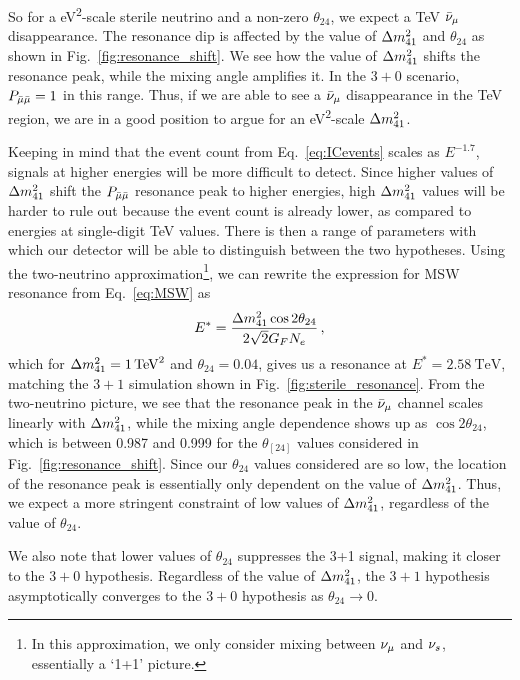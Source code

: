 So for a \si{\eV^2}-scale sterile neutrino and a non-zero $\theta_{24}$, we expect a \si{\TeV} $\bar{\nu}_\mu$ disappearance.
The resonance dip is affected by the value of $\dm[41]$ and $\theta_{24}$ as shown in Fig.~\ref{fig:resonance_shift}.
We see how the value of $\dm[41]$ shifts the resonance peak, while the mixing angle amplifies it. 
In the $3+0$ scenario, $P_{\bar{\mu} \bar{\mu}} = 1$ in this range. Thus, if we are able to see a $\bar{\nu}_\mu$ disappearance in the \si{\TeV} region,
we are in a good position to argue for an \si{\eV^2}-scale $\dm[41]$.  

Keeping in mind that the event count from Eq.~\ref{eq:ICevents} scales as $E^{-1.7}$,
signals at higher energies will be more difficult to detect. Since higher values of $\dm[41]$ shift the $P_{\bar{\mu} \bar{\mu}}$ resonance peak to higher 
energies, high $\dm[41]$ values will be harder to rule out because the event count is already lower, as compared to energies 
at single-digit \si{\TeV} values. There is then a range of parameters with which our detector will 
be able to distinguish between the two hypotheses. Using the two-neutrino approximation\footnote{In this approximation, we only consider mixing between $\nu_\mu$ and $\nu_s$, essentially a `1+1' picture.}, 
we can rewrite the expression for MSW resonance from Eq.~\ref{eq:MSW} as 
\begin{align}
    E^* = \frac{\dm[41] \cos{2\theta_{24}}}{2\sqrt{2} G_F N_e}\,,
\end{align}
which for $\dm[41] = \SI{1}{\TeV^2}$ and $\theta_{24} = 0.04$, gives us a resonance at $E^* = \SI{2.58}{\TeV}$, matching the $3+1$ simulation shown in
Fig.~\ref{fig:sterile_resonance}. From the two-neutrino picture, 
we see that the resonance peak in the $\bar{\nu}_\mu$ channel scales linearly with $\dm[41]$, while the mixing angle dependence 
shows up as $\cos{2\theta_{24}}$, which is between 0.987 and 0.999 for the $\theta_[24]$ values considered in Fig.~\ref{fig:resonance_shift}.
Since our $\theta_{24}$ values considered are so low, the location of the resonance peak is essentially only dependent on the value of $\dm[41]$.
Thus, we expect a more stringent constraint of low values of $\dm[41]$, regardless of the value of $\theta_{24}$.

We also note that lower values of $\theta_{24}$ suppresses the 3+1 signal, making it closer to the $3+0$ hypothesis. 
Regardless of the value of $\dm[41]$, the $3+1$ hypothesis asymptotically converges to the $3+0$ hypothesis as $\theta_{24} \to 0$.